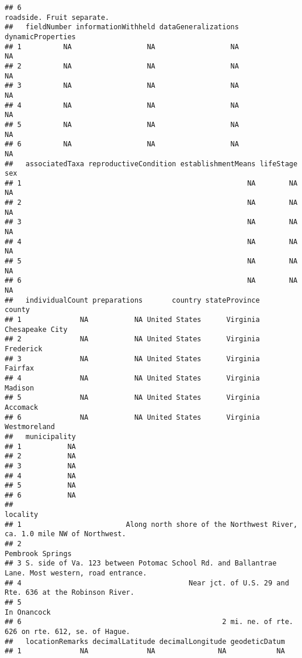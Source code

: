 \documentclass[
]{article}
\begin{document}
\begin{verbatim}
## 6                                                                    roadside. Fruit separate.
##   fieldNumber informationWithheld dataGeneralizations dynamicProperties
## 1          NA                  NA                  NA                NA
## 2          NA                  NA                  NA                NA
## 3          NA                  NA                  NA                NA
## 4          NA                  NA                  NA                NA
## 5          NA                  NA                  NA                NA
## 6          NA                  NA                  NA                NA
##   associatedTaxa reproductiveCondition establishmentMeans lifeStage sex
## 1                                                      NA        NA  NA
## 2                                                      NA        NA  NA
## 3                                                      NA        NA  NA
## 4                                                      NA        NA  NA
## 5                                                      NA        NA  NA
## 6                                                      NA        NA  NA
##   individualCount preparations       country stateProvince          county
## 1              NA           NA United States      Virginia Chesapeake City
## 2              NA           NA United States      Virginia       Frederick
## 3              NA           NA United States      Virginia         Fairfax
## 4              NA           NA United States      Virginia         Madison
## 5              NA           NA United States      Virginia        Accomack
## 6              NA           NA United States      Virginia    Westmoreland
##   municipality
## 1           NA
## 2           NA
## 3           NA
## 4           NA
## 5           NA
## 6           NA
##                                                                                          locality
## 1                         Along north shore of the Northwest River, ca. 1.0 mile NW of Northwest.
## 2                                                                                Pembrook Springs
## 3 S. side of Va. 123 between Potomac School Rd. and Ballantrae Lane. Most western, road entrance.
## 4                                        Near jct. of U.S. 29 and Rte. 636 at the Robinson River.
## 5                                                                                     In Onancock
## 6                                                2 mi. ne. of rte. 626 on rte. 612, se. of Hague.
##   locationRemarks decimalLatitude decimalLongitude geodeticDatum
## 1              NA              NA               NA            NA

\end{verbatim}
\end{document}
